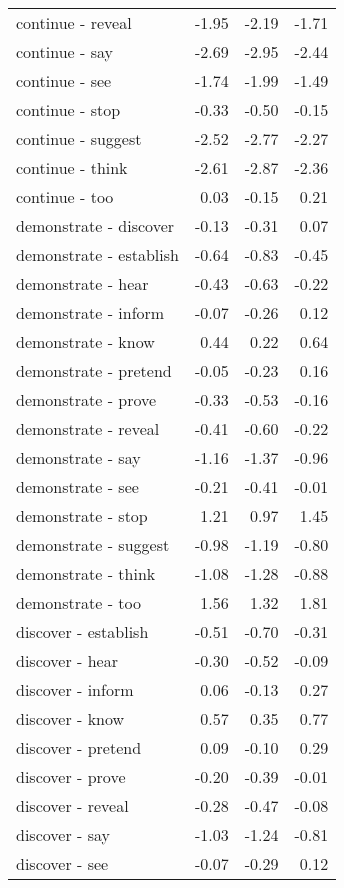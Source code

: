 \begin{longtable}{lrrr}
  continue - reveal & -1.95 & -2.19 & -1.71 \\ 
  continue - say & -2.69 & -2.95 & -2.44 \\ 
  continue - see & -1.74 & -1.99 & -1.49 \\ 
  continue - stop & -0.33 & -0.50 & -0.15 \\ 
  continue - suggest & -2.52 & -2.77 & -2.27 \\ 
  continue - think & -2.61 & -2.87 & -2.36 \\ 
  continue - too & 0.03 & -0.15 & 0.21 \\ 
  demonstrate - discover & -0.13 & -0.31 & 0.07 \\ 
  demonstrate - establish & -0.64 & -0.83 & -0.45 \\ 
  demonstrate - hear & -0.43 & -0.63 & -0.22 \\ 
  demonstrate - inform & -0.07 & -0.26 & 0.12 \\ 
  demonstrate - know & 0.44 & 0.22 & 0.64 \\ 
  demonstrate - pretend & -0.05 & -0.23 & 0.16 \\ 
  demonstrate - prove & -0.33 & -0.53 & -0.16 \\ 
  demonstrate - reveal & -0.41 & -0.60 & -0.22 \\ 
  demonstrate - say & -1.16 & -1.37 & -0.96 \\ 
  demonstrate - see & -0.21 & -0.41 & -0.01 \\ 
  demonstrate - stop & 1.21 & 0.97 & 1.45 \\ 
  demonstrate - suggest & -0.98 & -1.19 & -0.80 \\ 
  demonstrate - think & -1.08 & -1.28 & -0.88 \\ 
  demonstrate - too & 1.56 & 1.32 & 1.81 \\ 
  discover - establish & -0.51 & -0.70 & -0.31 \\ 
  discover - hear & -0.30 & -0.52 & -0.09 \\ 
  discover - inform & 0.06 & -0.13 & 0.27 \\ 
  discover - know & 0.57 & 0.35 & 0.77 \\ 
  discover - pretend & 0.09 & -0.10 & 0.29 \\ 
  discover - prove & -0.20 & -0.39 & -0.01 \\ 
  discover - reveal & -0.28 & -0.47 & -0.08 \\ 
  discover - say & -1.03 & -1.24 & -0.81 \\ 
  discover - see & -0.07 & -0.29 & 0.12 \\ 

\end{longtable}
